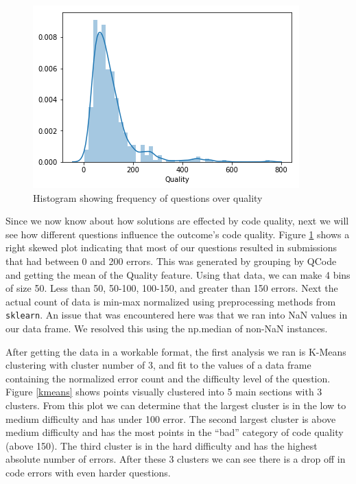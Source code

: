 \documentclass{article}
\begin{document}
\begin{figure}[ht] \vskip 0.2in \begin{center}
\centerline{\includegraphics[width=\columnwidth]{../images/QualityVsQuestion.png}}
\caption{ Histogram showing frequency of questions over quality } \label{qualityvquestion} \end{center} \vskip -0.2in \end{figure}

Since we now know about how solutions are effected by code quality, next
we will see how different questions influence the outcome's code
quality. Figure \ref{qualityvquestion} shows a right skewed plot
indicating that most of our questions resulted in submissions that had
between 0 and 200 errors. This was generated by grouping by QCode and
getting the mean of the Quality feature. Using that data, we can make 4
bins of size 50. Less than 50, 50-100, 100-150, and greater than 150
errors. Next the actual count of data is min-max normalized using
preprocessing methods from \texttt{sklearn}. An issue that was
encountered here was that we ran into NaN values in our data frame. We
resolved this using the np.median of non-NaN instances.

After getting the data in a workable format, the first analysis we ran
is K-Means clustering with cluster number of 3, and fit to the values of
a data frame containing the normalized error count and the difficulty
level of the question. Figure \ref{kmeans} shows points visually
clustered into 5 main sections with 3 clusters. From this plot we can
determine that the largest cluster is in the low to medium difficulty
and has under 100 error. The second largest cluster is above medium
difficulty and has the most points in the ``bad'' category of code
quality (above 150). The third cluster is in the hard difficulty and has
the highest absolute number of errors. After these 3 clusters we can see
there is a drop off in code errors with even harder questions.
\end{document}
